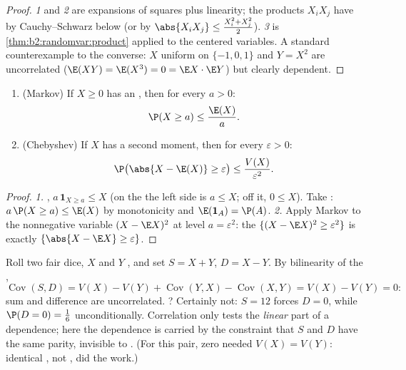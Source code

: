 \begin{proof}
\emph{1} and \emph{2} are expansions of squares plus linearity;
the products $X_iX_j$ have  by Cauchy--Schwarz below
(or by $\abs{X_iX_j} \leq \frac{X_i^2 + X_j^2}{2}$). \emph{3} is
\cref{thm:b2:randomvar:product} applied to the centered
variables. A standard counterexample to the converse: $X$ uniform
on $\{-1, 0, 1\}$ and $Y = X^2$ are uncorrelated
($\E(XY) = \E(X^3) = 0 = \E X \cdot \E Y$) but clearly dependent.
\end{proof}

\begin{theorem}\label{thm:b2:randomvar:markov}
\leavevmode
\begin{enumerate}
\item (Markov) If $X \geq 0$ has an , then for every $a
> 0$:
\[
\P(X \geq a) \leq \frac{\E(X)}{a} .
\]
\item (Chebyshev) If $X$ has a second moment, then for every
$\varepsilon > 0$:
\[
\P\bigl(\abs{X - \E(X)} \geq \varepsilon\bigr)
\leq \frac{V(X)}{\varepsilon^2} .
\]
\end{enumerate}
\end{theorem}

\begin{proof}
\emph{1.} , $a\,\mathbf{1}_{X \geq a} \leq X$ (on the
 the left side is $a \leq X$; off it, $0 \leq X$). Take
: $a\,\P(X \geq a) \leq \E(X)$ by monotonicity and
$\E(\mathbf{1}_A) = \P(A)$.
\emph{2.} Apply Markov to the nonnegative variable $(X - \E
X)^2$ at level $a = \varepsilon^2$: the  $\{(X - \E X)^2
\geq \varepsilon^2\}$ is exactly $\{\abs{X - \E X} \geq
\varepsilon\}$.
\end{proof}

\begin{example}\label{ex:b2:randomvar:sumdiff}
Roll two fair dice, $X$ and $Y$ , and set $S = X +
Y$, $D = X - Y$. By bilinearity of the ,
\[
\operatorname{Cov}(S, D) = V(X) - V(Y) +
\operatorname{Cov}(Y, X) - \operatorname{Cov}(X, Y) = V(X) -
V(Y) = 0 :
\]
sum and difference are uncorrelated. ? Certainly
not: $S = 12$ forces $D = 0$, while $\P(D = 0) =
\frac16$ unconditionally. Correlation only tests the
\emph{linear} part of a dependence; here the dependence is
carried by the constraint that $S$ and $D$ have the same
parity, invisible to . (For this pair, zero
 needed $V(X) = V(Y)$: identical ,
not , did the work.)
\end{example}

